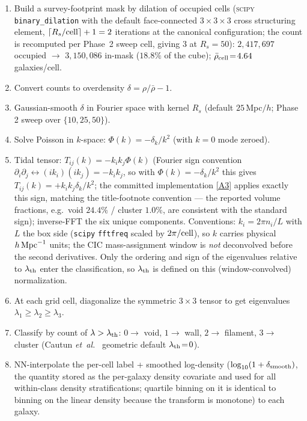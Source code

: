 \documentclass[twocolumn,linenumbers]{aastex702}
\newcommand{\repoBase}{https://github.com/Hubify-Projects/bigbounce/blob/main}
\begin{document}
\begin{enumerate}
fractions shift by at most $0.70$~pp (wall $-0.70$, filament $+0.68$,
cluster $+0.20$, void $-0.18$), $97.8\%$ of common-mask cells and
$97.9\%$ of matched-spiral assignments retain their class, and
per-class $f_{\rm CW}$ moves by at most $0.23$~pp (the small wall
class; filament $-0.005$~pp, cluster $+0.013$~pp), leaving every
environment--chirality conclusion unchanged (artifact
\href{\repoBase/pipelines/p5\_desi\_chirality/outputs/23\_unique\_parent\_rebuild.json}{[A4]}).
\item Build a survey-footprint mask by dilation of occupied cells
(\textsc{scipy} \texttt{binary\_dilation} with the default
face-connected $3\!\times\!3\!\times\!3$ cross structuring element,
$\lceil R_s/{\rm cell}\rceil + 1 = 2$ iterations at the canonical
configuration; the count is recomputed per Phase~2 sweep cell,
giving 3 at $R_s\!=\!50$): $2{,}417{,}697$ occupied $\to$ $3{,}150{,}086$ in-mask
($18.8\%$ of the cube); $\bar\rho_{\rm cell}\!=\!4.64$ galaxies/cell.
\item Convert counts to overdensity
$\delta = \rho / \bar\rho - 1$.
\item Gaussian-smooth $\delta$ in Fourier space with kernel $R_s$
(default $25$\,Mpc$/h$; Phase 2 sweep over $\{10, 25, 50\}$).
\item Solve Poisson in $k$-space: $\Phi(k) = -\delta_k / k^2$
(with $k\!=\!0$ mode zeroed).
\item Tidal tensor: $T_{ij}(k) = -k_i k_j \Phi(k)$ (Fourier sign
convention $\partial_i \partial_j \leftrightarrow (ik_i)(ik_j) =
-k_i k_j$, so with $\Phi(k) = -\delta_k/k^2$ this gives
$T_{ij}(k) = +k_i k_j \delta_k / k^2$; the committed implementation
\href{\repoBase/pipelines/p5\_desi\_chirality/env\_finder/01\_compute\_vweb.py}{[A3]} applies exactly this sign,
matching the title-footnote convention --- the reported volume
fractions, e.g.\ void $24.4\%$ / cluster $1.0\%$, are consistent with
the standard sign); inverse-FFT the six
unique components. Conventions: $k_i = 2\pi n_i / L$ with $L$ the box
side (\texttt{scipy} \texttt{fftfreq} scaled by $2\pi/{\rm cell}$),
so $k$ carries physical $h\,{\rm Mpc}^{-1}$ units; the CIC
mass-assignment window is \emph{not} deconvolved before the second
derivatives. Only the ordering and sign of the eigenvalues relative
to $\lambda_{\rm th}$ enter the classification, so $\lambda_{\rm th}$
is defined on this (window-convolved) normalization.
\item At each grid cell, diagonalize the symmetric $3\!\times\!3$
tensor to get eigenvalues
$\lambda_1 \ge \lambda_2 \ge \lambda_3$.
\item Classify by count of $\lambda > \lambda_{\rm th}$:
$0 \to$ void, $1 \to$ wall, $2 \to$ filament, $3 \to$ cluster
(Cautun \textit{et~al.}\ \cite{Cautun2014} geometric default
$\lambda_{\rm th}\!=\!0$).
\item NN-interpolate the per-cell label + smoothed log-density
($\log_{10}(1 + \delta_{\rm smooth})$, the quantity stored as the
per-galaxy density covariate and used for all within-class density
stratifications; quartile binning on it is identical to binning on
the linear density because the transform is monotone) to each
galaxy.
\end{enumerate}
\end{document}

